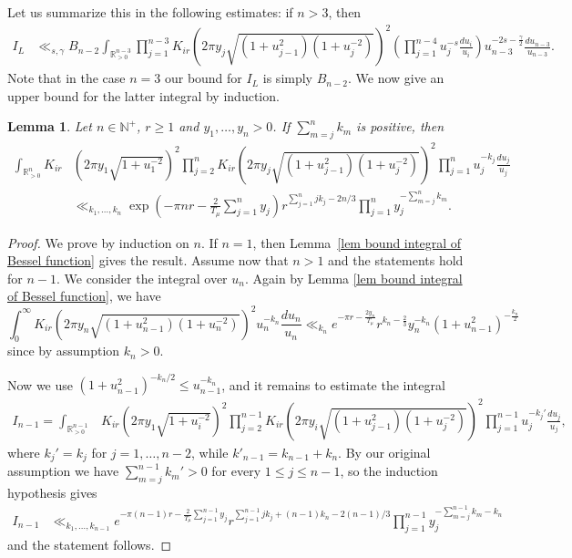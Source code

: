 \documentclass[11pt, oneside]{amsart}
\theoremstyle{plain}
\newtheorem{lemma}[theorem]{Lemma}
\theoremstyle{remark}
\newcommand{\N}{\mathbb{N}}
\newcommand{\R}{\mathbb{R}}
\begin{document}
 Let us summarize this
in the following estimates: if $n>3$, then
\begin{align}\label{eq:I_L_bound2}
I_L&\ll_{s,\gamma}   B_{n-2}\int_{\R_{>0}^{n-3}}\prod_{j=1}^{n-3}K_{ir}\left(2\pi y_j\sqrt{(1+u_{j-1}^2)(1+u_j^{-2})}\right)^2\left(\prod_{j=1}^{n-4}u_j^{-s}\frac{du_i}{u_i}\right)u_{n-3}^{-2s-\frac \gamma2}\frac{du_{n-3}}{u_{n-3}}.
\end{align}
Note that in the case $n=3$ our bound for $I_L$ is simply $B_{n-2}$.
We now give an upper bound for the latter integral  by induction.
\begin{lemma}
Let $n\in\N^+$, $r\geq1$ and $y_1,\dots,y_n>0$.
If
$\sum_{m=j}^nk_m$ is positive, then
\begin{align*}
\int_{\R_{>0}^n}K_{ir}&\left(2\pi y_1\sqrt{1+u_1^{-2}}\right)^2
\prod_{j=2}^nK_{ir}\left(2\pi y_j\sqrt{(1+u_{j-1}^2)(1+u_j^{-2})}\right)^2
\prod_{j=1}^nu_j^{-k_j}\frac{du_j}{u_j}\\
    &\ll_{k_1,\dots,k_n}
    \exp\left(-\pi nr-\frac2{T_\mu}\sum_{j=1}^n y_j\right)r^{\sum_{j=1}^n jk_j-2n/3}\prod_{j=1}^ny_j^{-\sum_{m=j}^nk_m}.
\end{align*}
\end{lemma}
\begin{proof}
We prove by induction on $n$. If $n=1$, then   Lemma~\ref{lem bound integral of Bessel function} 
gives the result.
Assume now that $n>1$ and the statements hold for $n-1$. We consider the integral over $u_n$. Again by Lemma \ref{lem bound integral of Bessel function}, we have
\[
\int_0^\infty K_{ir}\left(2\pi y_n\sqrt{(1+u_{n-1}^2)(1+u_n^{-2})}\right)^2u_n^{-k_n}\frac{du_n}{u_n}
\ll_{k_n}e^{-\pi r-\frac{2y_n}{T_\mu}}r^{k_n-\frac23}y_n^{-k_n}(1+u_{n-1}^2)^{-\frac{k_n}{2}}
\]
since by assumption $k_n>0$.

Now
we use $(1+u_{n-1}^2)^{-k_n/2}\leq u_{n-1}^{-k_n}$, and it remains
to estimate the integral 
\begin{align*}
I_{n-1}=\int_{\R_{>0}^{n-1}}&K_{ir}\left(2\pi y_1\sqrt{1+u_i^{-2}}\right)^2\prod_{j=2}^{n-1}K_{ir}\left(2\pi y_i\sqrt{(1+u_{j-1}^2)(1+u_j^{-2})}\right)^2\prod_{j=1}^{n-1}u_j^{-k_j'}\frac{du_j}{u_j},
\end{align*}
where $k_j'=k_j$ for $j=1,\dots,n-2$, while $k'_{n-1}=k_{n-1}+k_n$.  By
our original assumption we have 
$\sum_{m=j}^{n-1}k_m'>0$
for every $1\leq j\leq n-1$, so 
 the induction hypothesis gives
\begin{align*}
    I_{n-1}&\ll_{k_1,\dots,k_{n-1}}
    e^{-\pi(n-1)r-\frac2{T_\mu}\sum_{j=1}^{n-1}y_j}r^{\sum_{j=1}^{n-1} jk_j+(n-1)k_n-2(n-1)/3}\prod_{j=1}^{n-1}y_j^{-\sum_{m=j}^{n-1}k_m-k_n}
\end{align*}
and the statement follows.
\end{proof}
\end{document}
